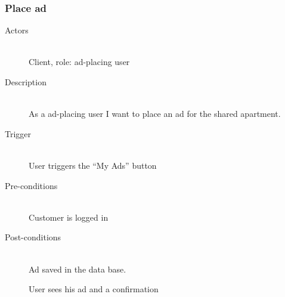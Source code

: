 \documentclass[a4wide]{article}
\begin{document}
\subsubsection{Place ad}
\begin{description}
\item[Actors]\mbox{}\\
Client, role: ad-placing user

\item[Description]\mbox{}\\
As a ad-placing user I want to place an ad for the shared apartment.
\item[Trigger]\mbox{}\\
User triggers the “My Ads” button

\item[Pre-conditions]\mbox{}\\
Customer is logged in

\item[Post-conditions]\mbox{}\\
Ad saved in the data base.

User sees his ad and a confirmation


\end{description}
\end{document}
